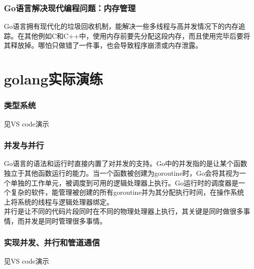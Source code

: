 \documentclass{beamer}
\begin{document}
	\begin{frame}
		\frametitle{Go语言解决现代编程问题：内存管理}
		Go语言拥有现代化的垃圾回收机制，能解决一些多线程与高并发情况下的内存追踪。在其他例如C和C++中，使用内存前要先分配这段内存，而且使用完毕后要将其释放掉。哪怕只做错了一件事，也会导致程序崩溃或内存泄露。
	\end{frame}
	
	\section{golang实际演练}
	\begin{frame}
		\frametitle{类型系统}
		\quad
		见VS code演示
	\end{frame}

	\begin{frame}
		\frametitle{并发与并行}
		\quad
		Go语言的语法和运行时直接内置了对并发的支持。Go中的并发指的是让某个函数独立于其他函数运行的能力。当一个函数被创建为goroutine时，Go会将其视为一个单独的工作单元，被调度到可用的逻辑处理器上执行。Go运行时的调度器是一个复杂的软件，能管理被创建的所有goroutine并为其分配执行时间，在操作系统上将系统的线程与逻辑处理器绑定。\\
		\quad
		并行是让不同的代码片段同时在不同的物理处理器上执行，其关键是同时做很多事情，而并发是同时管理很多事情。
	\end{frame}

	\begin{frame}
		\frametitle{实现并发、并行和管道通信}
		\quad
		见VS code演示
	\end{frame}
	
\end{document}
